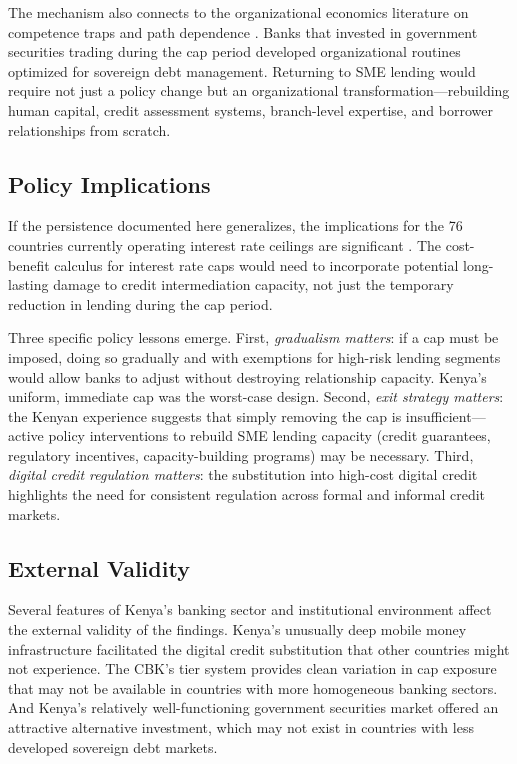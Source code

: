 \documentclass[12pt]{article}
\begin{document}
The mechanism also connects to the organizational economics literature on competence traps and path dependence \citep{hannan1984structural}. Banks that invested in government securities trading during the cap period developed organizational routines optimized for sovereign debt management. Returning to SME lending would require not just a policy change but an organizational transformation---rebuilding human capital, credit assessment systems, branch-level expertise, and borrower relationships from scratch.

\subsection{Policy Implications}

If the persistence documented here generalizes, the implications for the 76 countries currently operating interest rate ceilings are significant \citep{maimbo2014interest}. The cost-benefit calculus for interest rate caps would need to incorporate potential long-lasting damage to credit intermediation capacity, not just the temporary reduction in lending during the cap period.

Three specific policy lessons emerge. First, \textit{gradualism matters}: if a cap must be imposed, doing so gradually and with exemptions for high-risk lending segments would allow banks to adjust without destroying relationship capacity. Kenya's uniform, immediate cap was the worst-case design. Second, \textit{exit strategy matters}: the Kenyan experience suggests that simply removing the cap is insufficient---active policy interventions to rebuild SME lending capacity (credit guarantees, regulatory incentives, capacity-building programs) may be necessary. Third, \textit{digital credit regulation matters}: the substitution into high-cost digital credit highlights the need for consistent regulation across formal and informal credit markets.

\subsection{External Validity}

Several features of Kenya's banking sector and institutional environment affect the external validity of the findings. Kenya's unusually deep mobile money infrastructure facilitated the digital credit substitution that other countries might not experience. The CBK's tier system provides clean variation in cap exposure that may not be available in countries with more homogeneous banking sectors. And Kenya's relatively well-functioning government securities market offered an attractive alternative investment, which may not exist in countries with less developed sovereign debt markets.
\end{document}
